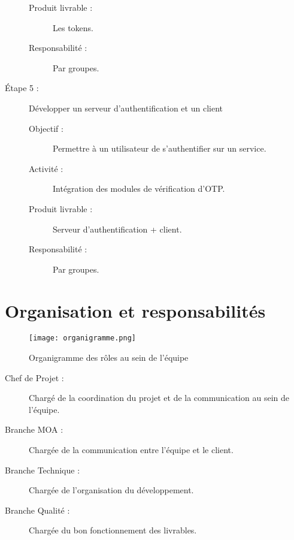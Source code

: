 \documentclass{../../res/univ-projet}
\begin{document}
\begin{description}
\begin{description}
		        \item [Produit livrable :] Les tokens.
		        \item [Responsabilité :]  Par groupes.
		    \end{description}
	    \item [Étape 5 :] Développer un serveur d'authentification et un client
		    \begin{description}
		        \item [Objectif :] Permettre à un utilisateur de s'authentifier sur un service.
		        \item [Activité :] Intégration des modules de vérification d'OTP.
		        \item [Produit livrable :] Serveur d'authentification + client.
		        \item [Responsabilité :] Par groupes.
	        \end{description}
    \end{description}
\newpage
\section{Organisation et responsabilités}
	\begin{figure}[h]
	\texttt{[image: organigramme.png]}
	\caption{Organigramme des rôles au sein de l'équipe}
	\end{figure}
	\begin{description}
	\item[Chef de Projet :] Chargé de la coordination du projet et de la communication au sein de l'équipe.
	\item[Branche MOA :] Chargée de la communication entre l'équipe et le client.
	\item[Branche Technique :] Chargée de l'organisation du développement.
	\item[Branche Qualité :] Chargée du bon fonctionnement des livrables. 
	\end{description}
\newpage
\end{document}
